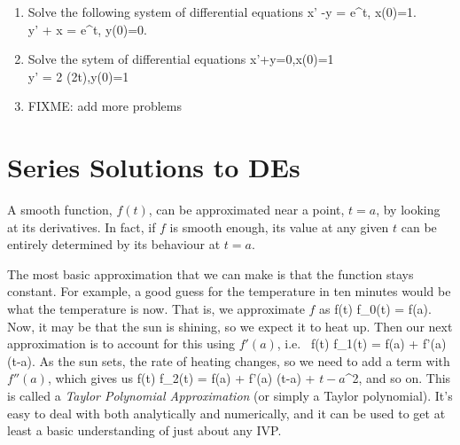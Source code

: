 \documentclass[12pt]{article}
\begin{document}
\begin{enumerate}
  \item
    Solve the following system of differential equations
    \bee
    x' -y = e^t, \qquad x(0)=1.
    \\
    y' + x = e^t, \qquad y(0)=0.
    \eee

    \item
      Solve the sytem of differential equations 
      \bee
      x'+y=0,\qquad x(0)=1
      \\
      y' = 2 \cosh(2t),\qquad y(0)=1
      \eee
    \item

    FIXME: add more problems

\end{enumerate}

\newpage
\section{Series Solutions to DEs}

A smooth function, $f(t)$, can be approximated near a point, $t=a$, by looking 
at its derivatives. In fact, if $f$ is smooth enough, its value at any
given $t$ can be entirely determined by its behaviour at $t=a$.

The most basic approximation that we can make is that the function stays 
constant. For example, a good guess for the temperature in ten minutes would
be what the temperature is now. That is, we approximate $f$ as
\be
f(t) \approx f_0(t) = f(a).
\ee
Now, it may be that the sun is shining, so we expect it to heat up. Then our 
next approximation is to account for this using $f'(a)$, i.e.\
\be
f(t) \approx f_1(t) = f(a) + f'(a) (t-a).
\ee
As the sun sets, the rate of heating changes, so we need to add a term with
$f''(a)$, which gives us
\be
f(t) \approx f_2(t) = f(a) + f'(a) (t-a) + \(t-a\)^2,
\ee
and so on. This is called a \emph{Taylor Polynomial Approximation} (or simply a
Taylor polynomial). It's easy to deal with both analytically and numerically,
and it can be used to get at least a basic understanding of just about any IVP.
\end{document}
